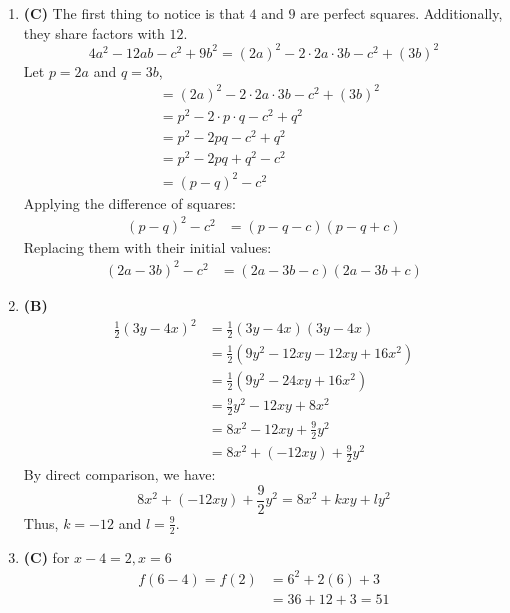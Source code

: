 \begin{multicols}{2}
\begin{enumerate}[label={\textbf{\arabic*.}}]
    \item \textbf{(C)} The first thing to notice is that \(4\) and \(9\) are perfect squares. Additionally, they share factors with \(12\).
        \[4a^2 - 12ab - c^2 + 9b^2 = (2a)^2 - 2 \cdot 2a \cdot 3b - c^2 + (3b)^2\]
        Let \(p = 2a\) and \(q = 3b\),
        \begin{align*}
            &= (2a)^2 - 2 \cdot 2a \cdot 3b - c^2 + (3b)^2 \\
            &= p^2 - 2 \cdot p \cdot q - c^2 + q^2 \\
            &= p^2 - 2pq - c^2 + q^2 \\
            &= p^2 - 2pq + q^2 - c^2 \\
            &= (p - q)^2 - c^2
        \end{align*}
        Applying the difference of squares:
        \begin{align*}
            (p - q)^2 - c^2 &= (p - q - c)(p - q + c)
        \end{align*}
        Replacing them with their initial values:
        \begin{align*}
            (2a - 3b)^2 - c^2 &= (2a - 3b - c)(2a - 3b + c)
        \end{align*}

        \item \textbf{(B)} 
        \begin{align*}
            \frac{1}{2}(3y - 4x)^2 &= \frac{1}{2}(3y - 4x)(3y - 4x) \\
            &= \frac{1}{2}(9y^2 - 12xy - 12xy + 16x^2) \\
            &= \frac{1}{2}(9y^2 - 24xy + 16x^2) \\
            &= \frac{9}{2}y^2 - 12xy + 8x^2 \\ 
            &= 8x^2 - 12xy + \frac{9}{2}y^2 \\ 
            &= 8x^2 + (-12xy) + \frac{9}{2}y^2
        \end{align*}
        By direct comparison, we have:
        \[8x^2 + (-12xy) + \frac{9}{2}y^2 = 8x^2 + kxy + ly^2\]
        Thus, \( k = -12 \) and \( l = \frac{9}{2} \).
        

    \item \textbf{(C)} for $x - 4 = 2, x = 6$ 
    \begin{align*} 
        f(6 - 4 ) = f(2) &= 6^2 + 2(6) + 3 \\
        & = 36 + 12 + 3  = 51
    \end{align*}


\end{enumerate}
\end{multicols}
